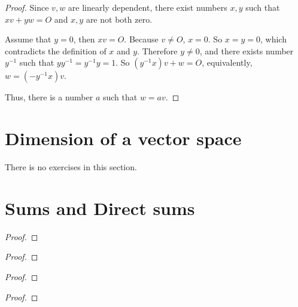 \begin{proof}
    Since $v, w$ are linearly dependent, there exist numbers $x, y$ such that $xv + yw = O$ and $x, y$ are not both zero.

    Assume that $y = 0$, then $xv = O$. Because $v\ne O$, $x = 0$. So $x = y = 0$, which contradicts the definition of $x$ and $y$. Therefore $y\ne 0$, and there exists number $y^{-1}$ such that $yy^{-1} = y^{-1}y = 1$. So $(y^{-1}x)v + w = O$, equivalently, $w = (-y^{-1}x)v$.

    Thus, there is a number $a$ such that $w = av$.
\end{proof}

\section{Dimension of a vector space}

There is no exercises in this section.

\section{Sums and Direct sums}

\begin{exercise}
\end{exercise}

\begin{proof}
\end{proof}

\begin{exercise}
\end{exercise}

\begin{proof}
\end{proof}

\begin{exercise}
\end{exercise}

\begin{proof}
\end{proof}

\begin{exercise}
\end{exercise}

\begin{proof}
\end{proof}
